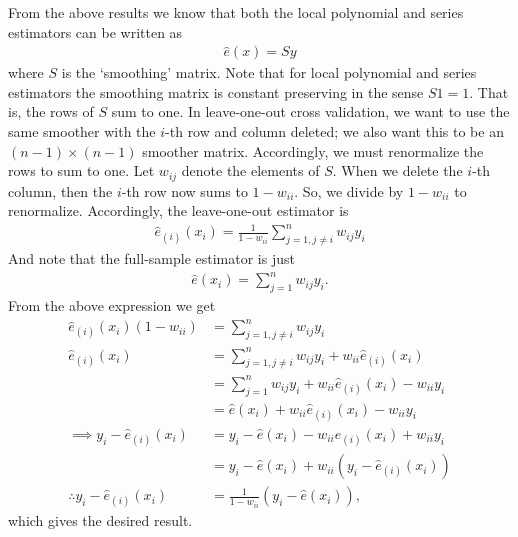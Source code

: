 \documentclass[12pt]{article}
\newcommand{\mtx}[1]{\ensuremath{\bm{\mathit{#1}}}}
\begin{document}
From the above results we know that both the local polynomial and series estimators can be written as
\begin{align*}
\hat{\mtx{e}}(x) = \mtx{S}\mtx{y}
\end{align*}
where $\mtx{S}$ is the `smoothing' matrix. Note that for local polynomial and series estimators the smoothing matrix is constant preserving in the sense $\mtx{S}{\mtx{1}} = \mtx{1}$. That is, the rows of \mtx{S} sum to one. In leave-one-out cross validation, we want to use the same smoother with the $i$-th row and column deleted; we also want this to be an $(n -1) \times (n - 1)$ smoother matrix. Accordingly, we must renormalize the rows to sum to one. Let $w_{ij}$ denote the elements of $\mtx{S}$. When we delete the $i$-th column, then the $i$-th row now sums to $1- w_{ii}$. So, we divide by $1- w_{ii}$ to renormalize. Accordingly, the leave-one-out estimator is
\begin{align*}
\hat e_{(i)}(x_i) = \frac{1}{1-w_{ii}} \sum_{j=1,j\neq i}^n w_{ij}y_i
\end{align*}
And note that the full-sample estimator is just
\begin{align*}
\hat e(x_i) = \sum_{j=1}^n w_{ij}y_i.
\end{align*}
From the above expression we get
\begin{align*}
\hat e_{(i)}(x_i)(1-w_{ii}) &=\sum_{j=1,j\neq i}^n w_{ij}y_i\\
\hat e_{(i)}(x_i) &= \sum_{j=1,j\neq i}^n w_{ij}y_i + w_{ii}\hat e_{(i)}(x_i)\\
&=\sum_{j=1}^n w_{ij}y_i + w_{ii}\hat e_{(i)}(x_i) - w_{ii}y_i\\
&=\hat e(x_i)  + w_{ii}\hat e_{(i)}(x_i) - w_{ii}y_i\\
\implies y_i - \hat e_{(i)}(x_i) &= y_i -\hat e(x_i)  - w_{ii}\hat e_{(i)}(x_i) + w_{ii}y_i\\
&=y_i - \hat e(x_i) + w_{ii}(y_i - \hat e_{(i)}(x_i))\\
\therefore y_i - \hat e_{(i)}(x_i) &= \frac{1}{1-w_{ii}}(y_i - \hat e(x_i)),
\end{align*}
which gives the desired result.
\end{document}
